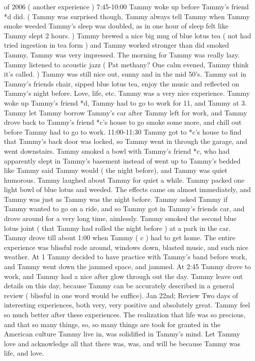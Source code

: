 \documentclass[12pt]{book}
\begin{document}
of 2006 ( another experience ) 7:45-10:00 Tammy woke up before Tammy's friend *d did. ( Tammy was surprised though, Tammy always tell Tammy when Tammy smoke weeded Tammy's sleep was doubled, as in one hour of sleep felt like Tammy slept 2 hours. ) Tammy brewed a nice big mug of blue lotus tea ( not had tried ingestion in tea form ) and Tammy worked stronger than did smoked Tammy, Tammy was very impressed. The morning for Tammy was really lazy. Tammy listened to acoustic jazz ( Pat methany? One calm evened, Tammy think it's called. ) Tammy was still nice out, sunny and in the mid 50's. Tammy sat in Tammy's friends chair, sipped blue lotus tea, enjoy the music and reflected on Tammy's night before. Love, life, etc. Tammy was a very nice experience. Tammy woke up Tammy's friend *d, Tammy had to go to work for 11, and Tammy at 3. Tammy let Tammy borrow Tammy's car after Tammy left for work, and Tammy drove back to Tammy's friend *c's house to go smoke some more, and chill out before Tammy had to go to work. 11:00-11:30 Tammy got to *c's house to find that Tammy's back door was locked, so Tammy went in through the garage, and went downstairs. Tammy smoked a bowl with Tammy's friend *c, who had apparently slept in Tammy's basement instead of went up to Tammy's bedded like Tammy said Tammy would ( the night before), and Tammy was quiet humorous. Tammy laughed about Tammy for quiet a while. Tammy packed one light bowl of blue lotus and weeded. The effects came on almost immediately, and Tammy was just as Tammy was the night before. Tammy asked Tammy if Tammy wanted to go on a ride, and so Tammy got in Tammy's friends car, and drove around for a very long time, aimlessly. Tammy smoked the second blue lotus joint ( that Tammy had rolled the night before ) at a park in the car. Tammy drove till about 1:00 when Tammy ( c ) had to get home. The entire experience was blissful rode around, windows down, blasted music, and such nice weather. At 1 Tammy decided to have practice with Tammy's band before work, and Tammy went down the jammed space, and jammed. At 2:45 Tammy drove to work, and Tammy had a nice after glow through out the day. Tammy leave out details on this day, because Tammy can be accurately described in a general review ( blissful in one word would be suffice). Jan 22nd; Review Two days of interesting experiences, both very, very positive and absolutely great. Tammy feel so much better after these experiences. The realization that life was so precious, and that so many things, so, so many things are took for granted in the American culture Tammy live in, was solidified in Tammy's mind. Let Tammy love and acknowledge all that there was, was, and will be because Tammy was life, and love.
\end{document}
